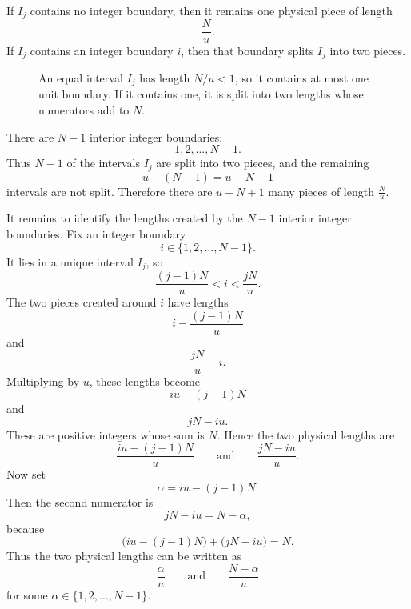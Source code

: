 \documentclass[11pt]{article}
\begin{document}
If \(I_j\) contains no integer boundary, then it remains one physical piece of length
\[
\frac{N}{u}.
\]
If \(I_j\) contains an integer boundary \(i\), then that boundary splits \(I_j\) into two pieces.

\begin{figure}[h]
\centering
{}
\caption{An equal interval \(I_j\) has length \(N/u<1\), so it contains at most one unit boundary. If it contains one, it is split into two lengths whose numerators add to \(N\).}
\end{figure}

There are \(N-1\) interior integer boundaries:
\[
1,2,\ldots,N-1.
\]
Thus \(N-1\) of the intervals \(I_j\) are split into two pieces, and the remaining
\[
u-(N-1)=u-N+1
\]
intervals are not split. Therefore there are $u-N+1$ many
pieces of length $\frac{N}{u}$.

It remains to identify the lengths created by the $N-1$ interior integer boundaries. Fix an integer boundary
\[
i\in\{1,2,\ldots,N-1\}.
\]
It lies in a unique interval \(I_j\), so
\[
\frac{(j-1)N}{u}<i<\frac{jN}{u}.
\]
The two pieces created around \(i\) have lengths
\[
i-\frac{(j-1)N}{u}
\]
and
\[
\frac{jN}{u}-i.
\]
Multiplying by \(u\), these lengths become
\[
iu-(j-1)N
\]
and
\[
jN-iu.
\]
These are positive integers whose sum is \(N\). Hence the two physical lengths are
\[
\frac{iu-(j-1)N}{u}
\qquad\text{and}\qquad
\frac{jN-iu}{u}.
\]
Now set
\[
\alpha=iu-(j-1)N.
\]
Then the second numerator is
\[
jN-iu=N-\alpha,
\]
because
\[
\bigl(iu-(j-1)N\bigr)+\bigl(jN-iu\bigr)=N.
\]
Thus the two physical lengths can be written as
\[
\frac{\alpha}{u}
\qquad\text{and}\qquad
\frac{N-\alpha}{u}
\]
for some \(\alpha\in\{1,2,\ldots,N-1\}\).
\end{document}
